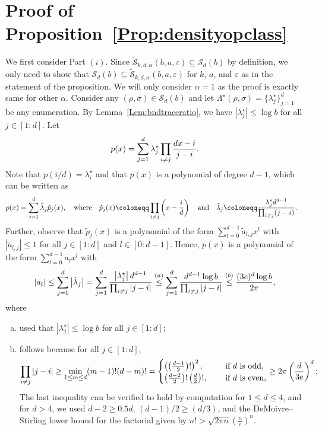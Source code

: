\documentclass[a4paper,onecolumn,11pt,accepted=2026-05-12]{quantumarticle}
\newcommand{\abs}[1]{\left\vert#1\right\vert}
\newcommand{\cS}{\mathcal{S}}
\begin{document}
\section{Proof of Proposition~\ref{Prop:densityopclass}}
\label{Prop:densityopclass-proof}
We first consider Part $(i)$. Since $\tilde{\cS}_{k,d,\alpha}(b,a,\varepsilon) \subseteq \cS_d(b)$ by definition, we only need to show that $\cS_d(b) \subseteq 
 \tilde{\cS}_{k,d,\alpha}(b,a,\varepsilon) $ for $k$, $a$, and $\varepsilon$ as in the statement of the proposition. We will only consider $\alpha=1$ as the proof is exactly same for other $\alpha$. 
Consider any $(\rho,\sigma) \in \cS_d(b)$ and let $ \Lambda^{\star}(\rho,\sigma)=\{\lambda_j^{\star}\}_{j=1}^d$ be any enumeration. By Lemma~\ref{Lem:bndtraceratio}, we have  $\abs{\lambda_j^{\star}} \leq \log  b $ for all $ j \in [1:d]$.
Let   
\begin{align}
    p(x)= \sum_{j=1}^d \lambda_j^{\star} \prod_{i \neq j} \frac{dx-i}{j-i}. \notag
\end{align}
Note that $p(i/d)=\lambda_i^{\star}$ and that $p(x)$ is a polynomial of degree $d-1$,  which can be written as
\begin{align}
  p(x)  &= \sum_{j=1}^d \tilde \lambda_j  \tilde p_j(x), \quad 
   \mbox{where} \quad   
  \tilde p_j(x) \coloneqq  \prod_{i \neq j} \left(x-\frac{i}{d}\right) \quad 
 \mbox{and} \quad \tilde \lambda_j \coloneqq \frac{ \lambda_j^{\star} d^{d-1}}{\prod_{i \neq j} (j-i)}. \notag
\end{align}
Further, observe that  $\tilde p_j(x)$ is a polynomial of the form $\sum_{l=0}^{d-1} \tilde a_{l,j} x^l$ with $\abs{\tilde a_{l,j}} \leq 1$ for all $j \in [1:d]$ and $l \in [0:d-1]$. Hence, $p(x)$ is a polynomial of the form $\sum_{l=0}^{d-1} a_l x^l$
with 
\begin{align}
\abs{a_l} \leq \sum_{j=1}^d \big|\tilde \lambda_j\big| =  \sum_{j=1}^d \frac{ \abs{\lambda_j^{\star}} d^{d-1}}{\prod_{i \neq j} \abs{j-i}} \stackrel{(a)}{\leq } \sum_{j=1}^d\frac{ d^{d-1} \log  b  }{\prod_{i \neq j} \abs{j-i}} \stackrel{(b)}{\leq } \frac{(3e)^d \log  b }{2\pi},\notag
\end{align}
where 
\begin{enumerate}[(a)]
    \item  used that $\abs{\lambda_j^{\star}} \leq \log  b $ for all $j \in [1:d]$;
    \item  follows because for all $j \in [1:d]$,  
\begin{align}
    \prod_{i \neq j} \abs{j-i} \geq \min_{1 \leq m \leq d} (m-1)! (d-m)!=\begin{cases}
        \left(\left(\frac{d-1}{2}\right)!\right)^2, & \quad \mbox{ if } d \mbox{ is odd},\\
        \left(\frac{d-2}{2}\right)!\left(\frac{d}{2}\right)! , & \quad \mbox{ if } d \mbox{ is even,}
    \end{cases} \geq 2 \pi  \left( \frac{d}{3e} \right)^d; \notag
\end{align}
  The last inequality can be verified to hold by computation for $1 \leq d \leq 4$, and for $d>4$, we used   
    $d-2 \geq 0.5 d$, $(d-1)/2 \geq (d/3)$, and the  DeMoivre--Stirling lower bound  for the factorial given by $n! > \sqrt{2 \pi n}\left(\frac{n}{e}\right)^n$.
\end{enumerate}   
\end{document}
